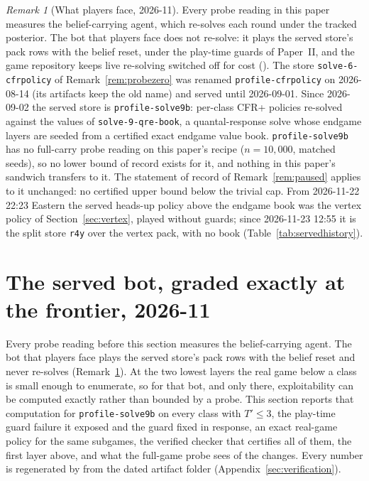 \documentclass[11pt]{article}
\theoremstyle{plain}
\theoremstyle{definition}
\theoremstyle{remark}
\newtheorem{remark}[theorem]{Remark}
\newcommand{\code}[1]{\texttt{\small #1}}
\begin{document}
\begin{remark}[What players face, 2026-11]\label{rem:served}
Every probe reading in this paper measures the belief-carrying agent,
which re-solves each round under the tracked posterior. The bot that
players face does not re-solve: it plays the served store's pack rows
with the belief reset, under the play-time guards of Paper~II, and the
game repository keeps live re-solving switched off for cost
(). The store
\code{solve-6-cfrpolicy} of Remark~\ref{rem:probezero} was renamed
\code{profile-cfrpolicy} on 2026-08-14 (its artifacts keep the old
name) and served until 2026-09-01. Since 2026-09-02 the served store
is \code{profile-solve9b}: per-class CFR+ policies re-solved against
the values of \code{solve-9-qre-book}, a quantal-response solve whose
endgame layers are seeded from a certified exact endgame value book.
\code{profile-solve9b} has no full-carry probe reading on this
paper's recipe ($n=10{,}000$, matched seeds), so no lower bound of
record exists for it, and nothing in this paper's sandwich transfers
to it. The statement of record of Remark~\ref{rem:paused} applies to
it unchanged: no certified upper bound below the trivial cap. From
2026-11-22 22:23 Eastern the served heads-up policy above the endgame
book was the vertex policy of Section~\ref{sec:vertex}, played without
guards; since 2026-11-23 12:55 it is the split store \code{r4y} over
the vertex pack, with no book (Table~\ref{tab:servedhistory}).
\end{remark}

\section{The served bot, graded exactly at the frontier, 2026-11}
\label{sec:frontier-served}
\sloppy

Every probe reading before this section measures the belief-carrying
agent. The bot that players face plays the served store's pack rows
with the belief reset and never re-solves (Remark~\ref{rem:served}).
At the two lowest layers the real game below a class is small enough to
enumerate, so for that bot, and only there, exploitability can be
computed exactly rather than bounded by a probe. This section reports
that computation for \code{profile-solve9b} on every class with
$T'\le3$, the play-time guard failure it exposed and the guard fixed in
response, an exact real-game policy for the same subgames, the verified
checker that certifies all of them, the first layer above, and what the
full-game probe sees of the changes. Every number is regenerated by
 from the dated
artifact folder 
(Appendix~\ref{sec:verification}).
\end{document}
